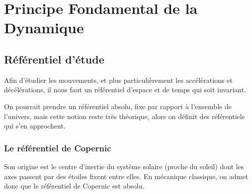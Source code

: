 \documentclass[11pt]{article}
\begin{document}
%

\section{Principe Fondamental de la Dynamique}

\subsection{Référentiel d'étude}

Afin d'étudier les mouvements, et plus particulièrement les accélérations et décélérations, il nous faut un référentiel d'espace et de temps qui soit invariant.

On pourrait prendre un référentiel absolu, fixe par rapport à l'ensemble de l'univers, mais cette notion reste très théorique, alors on définit des référentiels qui s'en approchent.

\subsubsection{Le référentiel de Copernic}

Son origine est le centre d'inertie du système solaire (proche du soleil) dont les axes passent par des étoiles fixent entre elles. En mécanique classique, on admet donc que le référentiel de Copernic est absolu.
\end{document}
